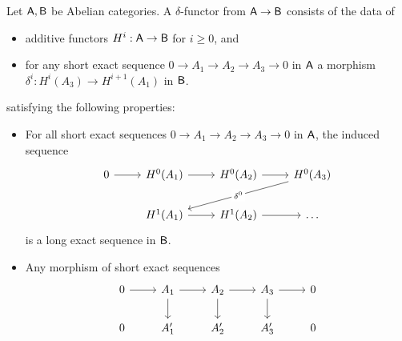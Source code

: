\begin{definition}\label{def: universal delta functor}
    Let $\Asf,\Bsf$ be Abelian categories. A $\delta$-functor from $\Asf\to\Bsf$ consists of the data of 
    \begin{itemize}
        \item additive functors $H^{i}:\Asf\to\Bsf$ for $i\geq0$, and 
        \item for any short exact sequence $0\to A_{1}\to A_{2}\to A_{3}\to 0$ in $\Asf$ a morphism $\delta^{i}:H^{i}(A_{3})\to H^{i+1}(A_{1})$ in $\Bsf$.
    \end{itemize}
    satisfying the following properties:
    \begin{itemize}
        \item For all short exact sequences $0\to A_{1}\to A_{2}\to A_{3}\to 0$ in $\Asf$, the induced sequence 
        $$%
        \begin{tikzcd}
            0 & {H^{0}(A_{1})} & {H^{0}(A_{2})} & {H^{0}(A_{3})} \\
            & {H^{1}(A_{1})} & {H^{1}(A_{2})} & \dots
            \arrow[from=1-1, to=1-2]
            \arrow[from=1-2, to=1-3]
            \arrow[from=1-3, to=1-4]
            \arrow["{\delta^{0}}"{description}, from=1-4, to=2-2]
            \arrow[from=2-2, to=2-3]
            \arrow[from=2-3, to=2-4]
        \end{tikzcd}$$
        is a long exact sequence in $\Bsf$. 
        \item Any morphism of short exact sequences
        $$%
        \begin{tikzcd}
            0 & {A_{1}} & {A_{2}} & {A_{3}} & 0 \\
            0 & {A_{1}'} & {A_{2}'} & {A_{3}'} & 0
            \arrow[from=1-1, to=1-2]
            \arrow[from=1-2, to=1-3]
            \arrow[from=1-2, to=2-2]
            \arrow[from=1-3, to=1-4]
            \arrow[from=1-3, to=2-3]
            \arrow[from=1-4, to=1-5]
            \arrow[from=1-4, to=2-4]

\end{tikzcd}$$
\end{itemize}
\end{definition}
